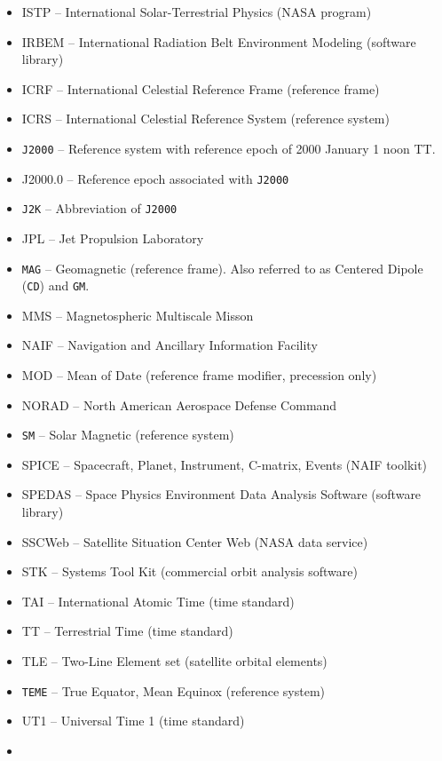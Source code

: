 \documentclass[draft]{agujournal2019}
\begin{document}
\begin{itemize}
\item ISTP -- International Solar-Terrestrial Physics (NASA program)
\item IRBEM -- International Radiation Belt Environment Modeling (software library)
\item ICRF -- International Celestial Reference Frame (reference frame)
\item ICRS -- International Celestial Reference System (reference system)
\item  \texttt{J2000} -- Reference system with reference epoch of 2000 January 1 noon TT.
\item J2000.0 -- Reference epoch associated with  \texttt{J2000}
\item  \texttt{J2K} -- Abbreviation of  \texttt{J2000}
\item JPL -- Jet Propulsion Laboratory
\item  \texttt{MAG} -- Geomagnetic (reference frame). Also referred to as Centered Dipole (\texttt{CD}) and \texttt{GM}.
\item MMS -- Magnetospheric Multiscale Misson 
\item NAIF -- Navigation and Ancillary Information Facility 
\item MOD -- Mean of Date (reference frame modifier, precession only)
\item NORAD -- North American Aerospace Defense Command
\item  \texttt{SM} -- Solar Magnetic (reference system)
\item SPICE -- Spacecraft, Planet, Instrument, C-matrix, Events (NAIF toolkit)
\item SPEDAS -- Space Physics Environment Data Analysis Software (software library)
\item SSCWeb -- Satellite Situation Center Web (NASA data service)
\item STK -- Systems Tool Kit (commercial orbit analysis software)
\item TAI -- International Atomic Time (time standard)
\item TT -- Terrestrial Time (time standard)
\item TLE -- Two-Line Element set (satellite orbital elements)
\item  \texttt{TEME} -- True Equator, Mean Equinox (reference system)
\item UT1 -- Universal Time 1 (time standard)
\item {}
\end{itemize}
\end{document}

